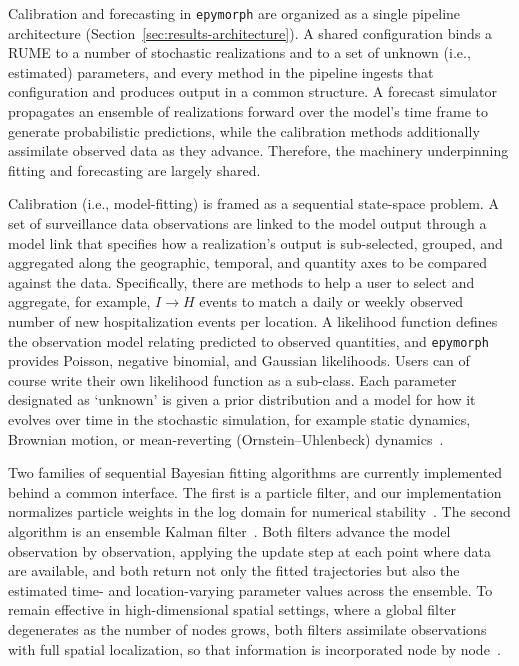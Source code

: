 Calibration and forecasting in \texttt{epymorph} are organized as a single pipeline architecture (Section~\ref{sec:results-architecture}).
A shared configuration binds a RUME to a number of stochastic realizations and to a set of unknown (i.e., estimated) parameters, and every method in the pipeline ingests
that configuration and produces output in a common structure. 
A forecast simulator propagates an ensemble of realizations forward over the model's time frame to generate probabilistic predictions, while the calibration methods additionally assimilate observed data as they advance.
Therefore, the machinery underpinning fitting and forecasting are largely shared. 

Calibration (i.e., model-fitting) is framed as a sequential state-space problem. 
A set of surveillance data observations are linked to the model output through a model link that specifies how a realization's output is sub-selected, grouped, and aggregated along the geographic, temporal, and quantity axes to be compared against the data.
Specifically, there are methods to help a user to select and aggregate, for example, $I \rightarrow H$ events to match a daily or weekly observed number of new hospitalization events per location. 
A likelihood function defines the observation model relating predicted to observed quantities, and \texttt{epymorph} provides Poisson, negative binomial, and Gaussian likelihoods.
Users can of course write their own likelihood function as a sub-class.
Each parameter designated as `unknown' is given a prior distribution and a model for how it evolves over time in the stochastic simulation, for example static dynamics, Brownian motion, or mean-reverting (Ornstein--Uhlenbeck) dynamics~\citep{drennan_estimating_2026}.

Two families of sequential Bayesian fitting algorithms are currently implemented behind a common interface. 
The first is a particle filter, and our implementation normalizes particle weights in the log domain for numerical stability~\citep{gordon_novel_1993,arulampalam_tutorial_2002}. 
The second algorithm is an ensemble Kalman filter~\citep{evensen_ensemble_2003}. 
Both filters advance the model observation by observation, applying the update step at each point where data are available, and both return not only the fitted trajectories but also the estimated time- and location-varying parameter values across the ensemble. 
To remain effective in high-dimensional spatial settings, where a global filter degenerates as the number of nodes grows, both filters assimilate observations with full spatial localization, so that information is incorporated node by node~\citep{ionides_iterated_2024}.

